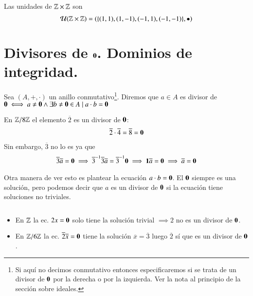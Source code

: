 \begin{ej}
	Las unidades de $\mathbb{Z} \times \mathbb{Z}$ son
	\begin{align*}
	\mathcal{U}(\mathbb{Z} \times \mathbb{Z}) = (\{(1,1), (1,-1), (-1,1), (-1,-1)\}, \bullet)
	\end{align*}
\end{ej}


\section{Divisores de $\mathbf{0}$. Dominios de integridad.}

\begin{dfn}[Divisor de 0]
	Sea $(A, +, \cdot)$ un anillo conmutativo\footnote{Si aquí no decimos conmutativo entonces especificaremos si se trata de un divisor de $\mathbf{0}$ por la derecha o por la izquierda. Ver la nota al principio de la sección sobre ideales.}. Diremos que $a \in A$ es divisor de $\mathbf{0} \iff a \neq \mathbf{0} \land \exists b \neq \mathbf{0} \in A \mid a\cdot b = \mathbf{0}$
\end{dfn}

\begin{ej}
	En $\mathbb{Z}/8\mathbb{Z}$ el elemento $\overline{2}$ es un divisor de $\mathbf{0}$:
	\begin{align*}
		\overline{2}\cdot\overline{4} = \overline{8} = \mathbf{0}
	\end{align*}
	Sin embargo, $\overline{3}$ no lo es ya que
	\begin{align*}
		\overline{3}\overline{a} = \mathbf{0} \implies \overline{3}^{-1}\overline{3}\overline{a} = \overline{3}^{-1}\mathbf{0} \implies \mathbf{1} \overline{a} = \mathbf{0} \implies \overline{a} = \mathbf{0}
	\end{align*}
\end{ej}

Otra manera de ver esto es plantear la ecuación $a \cdot b = \mathbf{0}$. El $\mathbf{0}$ siempre es una solución, pero podemos decir que $a$ es un divisor de $\mathbf{0}$ si la ecuación tiene soluciones no triviales.

\begin{ej}$ $\newline
	\begin{itemize}
		\item En $\mathbb{Z}$ la ec. $2x = \mathbf{0}$ solo tiene la solución trivial $\implies 2$ no es un divisor de $\mathbf{0}$.
		\item En $\mathbb{Z}/6\mathbb{Z}$ la ec. $\overline{2}\overline{x} = \mathbf{0}$ tiene la solución $\overline{x} = \overline{3}$ luego $\overline{2}$ sí que es un divisor de $\mathbf{0}$.
	\end{itemize}
\end{ej}

